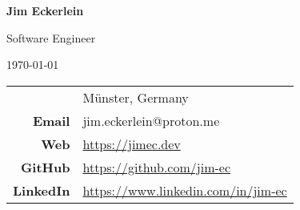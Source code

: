 \documentclass{article}
\begin{document}
{
\centering
{\huge \bfseries Jim Eckerlein}\par
\vspace{0.6em}
{\Large Software Engineer}\par
\vspace{0.4em}
{\today}\par
\vspace{1.2em}
}

\begin{tabular}{rl}
                    & Münster, Germany \\
\textbf{Email}      & jim.eckerlein@proton.me \\
\textbf{Web}        & \url{https://jimec.dev} \\
\textbf{GitHub}     & \url{https://github.com/jim-ec} \\
\textbf{LinkedIn}   & \url{https://www.linkedin.com/in/jim-ec} \\
\end{tabular}
\end{document}
